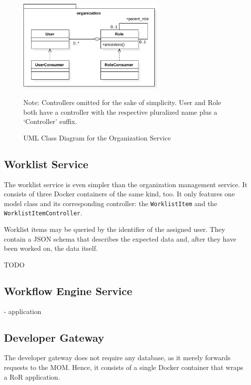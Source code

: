     \begin{figure}[htbp]
      \centering
      \includegraphics[width=0.65\textwidth]{content/images/class_diagram_organization-crop.pdf}
      \caption*{\scriptsize Note: Controllers omitted for the sake of simplicity. User and Role both have a controller with the respective pluralized name plus a `Controller' suffix.}
      \caption{UML Class Diagram for the Organization Service}
      \label{fig:uml_class_diagram_organization}
    \end{figure}

  \subsection{Worklist Service} %
    \label{sub:worklist_service}
      The worklist service is even simpler than the organization management service. It consists of three Docker containers of the same kind, too. It only features one model class and its corresponding controller: the \texttt{WorklistItem} and the \texttt{WorklistItemController}.

      Worklist items may be queried by the identifier of the assigned user. They contain a JSON schema that describes the expected data and, after they have been worked on, the data itself.

      TODO

  \subsection{Workflow Engine Service} %
    \label{sub:workflow_engine_service}
      - application

  \subsection{Developer Gateway} %
    \label{sub:developer_gateway}
      The developer gateway does not require any database, as it merely forwards requests to the \ac{MOM}. Hence, it consists of a single Docker container that wraps a \ac{RoR} application.

